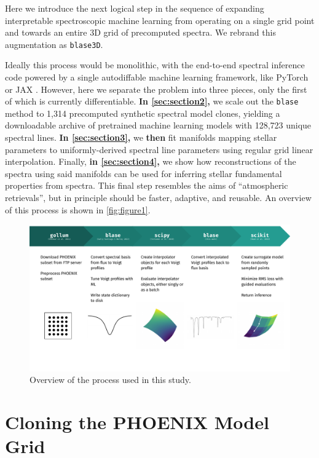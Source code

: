 \documentclass[twocolumn, linenumbers]{aastex631}
\begin{document}
Here we introduce the next logical step in the sequence of expanding interpretable spectroscopic machine learning from operating on a single grid point and towards an entire 3D grid of precomputed spectra.
We rebrand this augmentation as \texttt{blase3D}.

Ideally this process would be monolithic, with the end-to-end spectral inference code powered by a single autodiffable machine learning framework, like PyTorch \textbf{\citep{pytorch}} or JAX \citep{jax}.
However, here we separate the problem into three pieces, only the first of which is currently differentiable.
\textbf{In \autoref{sec:section2},} we scale out the \texttt{blase} method to 1,314 precomputed synthetic spectral model clones, yielding a downloadable archive of pretrained machine learning models with 128,723 unique spectral lines.
\textbf{In \autoref{sec:section3},} we \textbf{then} fit manifolds mapping stellar parameters to uniformly-derived spectral line parameters using regular grid linear interpolation.
Finally, \textbf{in \autoref{sec:section4},} we show how reconstructions of the spectra using said manifolds can be used for inferring stellar fundamental properties from spectra.
This final step resembles the aims of ``atmospheric retrievals'', but in principle should be faster, adaptive, and reusable.
An overview of this process is shown in \autoref{fig:figure1}.

\begin{figure}
    \centering
    \includegraphics[width=\textwidth]{figure1}
    \caption{Overview of the process used in this study.}
    \label{fig:figure1}
\end{figure}


\section{Cloning the PHOENIX Model Grid}
\label{sec:section2}
\end{document}
